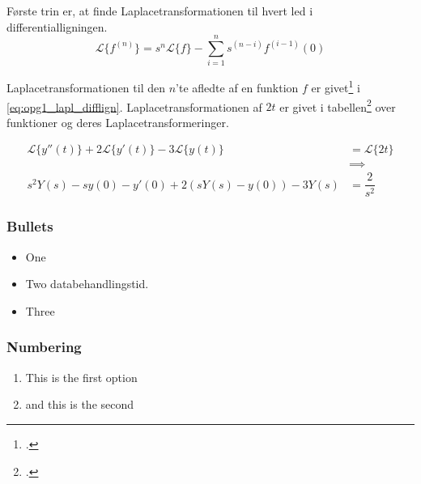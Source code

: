 Første trin er, at finde Laplacetransformationen til hvert led i differentialligningen.
\begin{equation}
\boxed
{
\mathcal{L}\{f^{(n)}\} = s^{n} \mathcal{L}\{f\} - \sum_{i=1}^{n} s^{(n-i)} f^{(i-1)}(0) %
}
\label{eq:opg1_lapl_difflign}
\end{equation}

Laplacetransformationen til den $n$'te afledte af en funktion $f$ er givet\footcite[228]{kreyzig} i \eqref{eq:opg1_lapl_difflign}. Laplacetransformationen af $2t$ er givet i tabellen\footcite[224]{kreyzig} over funktioner og deres Laplacetransformeringer.

\begin{align*} %
\mathcal{L}\{y''(t)\}+2\mathcal{L}\{y'(t)\}-3\mathcal{L}\{y(t)\}&=\mathcal{L}\{2t\}\\
&\implies \\
s^{2} Y(s) - s y(0) - y'(0) +2 \left( s Y(s)-y(0) \right) -3 Y(s) &= \dfrac{2}{s^{2}}
\end{align*}





\subsubsection{Bullets}

\begin{itemize}
\item One
\item Two databehandlingstid.
\item Three
\end{itemize}




\subsubsection{Numbering}

\begin{enumerate}
\item This is the first option
\item and this is the second
\end{enumerate}
